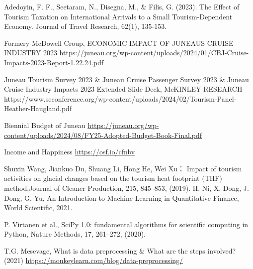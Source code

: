\documentclass[12pt]{article}  %
\begin{document}

 \clearpage   %
 
 \begin{thebibliography}{99}
    Adedoyin, F. F., Seetaram, N., Disegna, M., \& Filis, G. (2023). The Effect of Tourism Taxation on International Arrivals to a Small Tourism-Dependent Economy. Journal of Travel Research, 62(1), 135-153. 
     
    Formery McDowell Croup, ECONOMIC IMPACT OF JUNEAU\textquotesingle S CRUISE INDUSTRY 2023
    {https://juneau.org/wp-content/uploads/2024/01/CBJ-Cruise-Impacts-2023-Report-1.22.24.pdf}

    Juneau Tourism Survey 2023 \& Juneau Cruise Passenger Survey 2023 \& Juneau Cruise Industry Impacts 2023 Extended Slide Deck, McKINLEY RESEARCH
    {https://www.seconference.org/wp-content/uploads/2024/02/Tourism-Panel-Heather-Haugland.pdf}

    Biennial Budget of Juneau \href{https://juneau.org/wp-content/uploads/2024/08/FY25-Adopted-Budget-Book-Final.pdf}{https://juneau.org/wp-content/uploads/2024/08/FY25-Adopted-Budget-Book-Final.pdf}

   Income and Happiness \href{https://osf.io/cfnbv}{https://osf.io/cfnbv}

    Shuxin Wang, Jiankuo Du, Shuang Li, Hong He, Wei Xu：
    Impact of tourism activities on glacial changes based on the tourism heat footprint (THF) method,Journal of Cleaner Production, 215, 845--853, (2019).
   H. Ni, X. Dong, J. Dong, G. Yu, An Introduction to Machine Learning in Quantitative Finance, World Scientific, 2021.
   
   P. Virtanen et al., SciPy 1.0: fundamental algorithms for scientific computing in
   Python, Nature Methods, 17, 261--272, (2020).
   
   T.G. Mesevage, What is data preprocessing \& What are the steps involved? (2021) \href{https://monkeylearn.com/blog/data-preprocessing/}{https://monkeylearn.com/blog/data-preprocessing/}
 \end{thebibliography}
 
 
 
\end{document}

